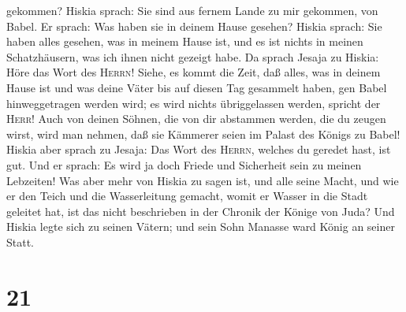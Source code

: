 gekommen? Hiskia sprach: Sie sind aus fernem Lande zu mir gekommen, von
Babel.  Er sprach: Was haben sie in deinem Hause gesehen?
Hiskia sprach: Sie haben alles gesehen, was in meinem Hause ist, und es
ist nichts in meinen Schatzhäusern, was ich ihnen nicht gezeigt habe.
 Da sprach Jesaja zu Hiskia:  Höre das
Wort des \textsc{Herrn}! Siehe, es kommt die Zeit, daß alles, was in
deinem Hause ist und was deine Väter bis auf diesen Tag gesammelt haben,
gen Babel hinweggetragen werden wird; es wird nichts übriggelassen
werden, spricht der \textsc{Herr}!  Auch von deinen
Söhnen, die von dir abstammen werden, die du zeugen wirst, wird man
nehmen, daß sie Kämmerer seien im Palast des Königs zu Babel!
 Hiskia aber sprach zu Jesaja: Das Wort des
\textsc{Herrn}, welches du geredet hast, ist gut. Und er sprach: Es wird
ja doch Friede und Sicherheit sein zu meinen Lebzeiten! 
Was aber mehr von Hiskia zu sagen ist, und alle seine Macht, und wie er
den Teich und die Wasserleitung gemacht, womit er Wasser in die Stadt
geleitet hat, ist das nicht beschrieben in der Chronik der Könige von
Juda?  Und Hiskia legte sich zu seinen Vätern; und sein
Sohn Manasse ward König an seiner Statt.

\hypertarget{section-20}{%
\section{21}\label{section-20}}


